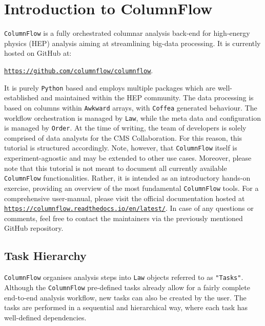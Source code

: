 \chapter{Introduction to ColumnFlow}

\texttt{ColumnFlow} is a fully orchestrated columnar analysis back-end for high-energy physics (HEP) analysis aiming at streamlining big-data processing. It is currently hosted on GitHub at:

\texttt{\textcolor{LimeGreen}{\href{https://github.com/columnflow/columnflow}{\underline{https://github.com/columnflow/columnflow}}}}.

It is purely \texttt{Python} based and employs multiple packages which are well-established and maintained within the HEP community. The data processing is based on columns within \texttt{Awkward} arrays, with \texttt{Coffea} generated behaviour. The workflow orchestration is managed by \texttt{Law}, while the meta data and configuration is managed by \texttt{Order}. At the time of writing, the team of developers is solely comprised of data analysts for the CMS Collaboration. For this reason, this tutorial is structured accordingly. Note, however, that \texttt{ColumnFlow} itself is experiment-agnostic and may be extended to other use cases. Moreover, please note that this tutorial is not meant to document all currently available \texttt{ColumnFlow} functionalities. Rather, it is intended as an introductory hands-on exercise, providing an overview of the most fundamental \texttt{ColumnFlow} tools. For a comprehensive user-manual, please visit the official documentation hosted at \texttt{\textcolor{LimeGreen}{\href{https://columnflow.readthedocs.io/en/latest/}{\underline{https://columnflow.readthedocs.io/en/latest/}}}}. In case of any questions or comments, feel free to contact the maintainers via the previously mentioned GitHub repository. 

\section{Task Hierarchy}

\texttt{ColumnFlow} organises analysis steps into \texttt{Law} objects referred to as \texttt{"Tasks"}. Although the \texttt{ColumnFlow} pre-defined tasks already allow for a fairly complete end-to-end analysis workflow, new tasks can also be created by the user. The tasks are performed in a sequential and hierarchical way, where each task has well-defined dependencies. 

